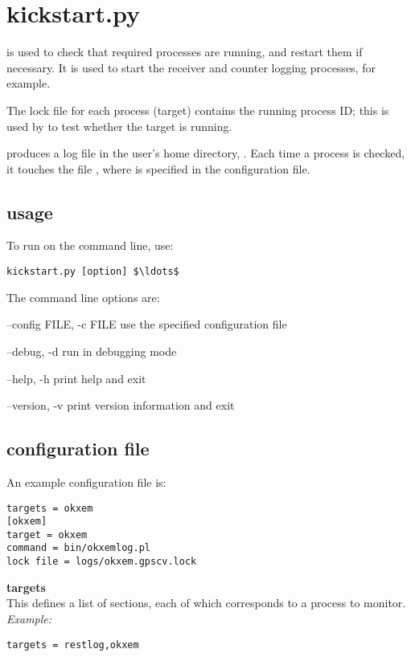 \section{kickstart.py \label{s:kickstart}}

 is used to check that required processes are running,
and restart them if necessary. 
It is used to start the receiver and counter logging processes, for example.

The lock file for each process (target) contains the running process ID; 
this is used by  to test whether the target is running.

 produces a log file in the user's home directory, . Each time 
a process is checked, it touches the file , where  is
specified in the configuration file.

\subsection{usage}

To run  on the command line, use:
\begin{lstlisting}[mathescape=true]
kickstart.py [option] $\ldots$
\end{lstlisting}
The command line options are:
\begin{description*}
	\item[--config FILE, -c  FILE] use the specified configuration file
	\item[--debug, -d ]	run in debugging mode
	\item[--help, -h]	print help and exit
	\item[--version, -v]	print version information and exit
\end{description*}

\subsection{configuration file}

An example configuration file is:
\begin{lstlisting}
targets = okxem
[okxem]
target = okxem
command = bin/okxemlog.pl 
lock file = logs/okxem.gpscv.lock
\end{lstlisting}

{\bfseries targets}\\
This defines a list of sections, each of which corresponds to a process to monitor.\\
\textit{Example:}
\begin{lstlisting}
targets = restlog,okxem
\end{lstlisting}

